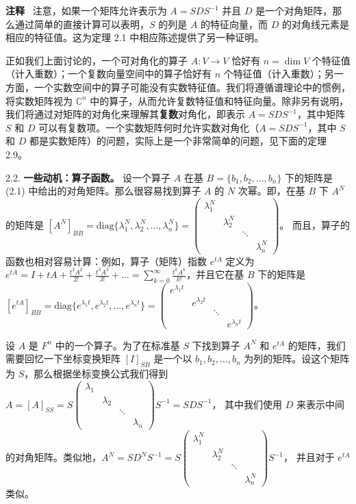 \textbf{注释} ~注意，如果一个矩阵允许表示为 $A = SDS^{-1}$ 并且 $D$ 是一个对角矩阵，那么通过简单的直接计算可以表明，$S$ 的列是 $A$ 的特征向量，而 $D$ 的对角线元素是相应的特征值。这为定理 2.1 中相应陈述提供了另一种证明。



正如我们上面讨论的，一个可对角化的算子 $A: V \to V$ 恰好有 $n = \dim V$ 个特征值（计入重数）；一个复数向量空间中的算子恰好有 $n$ 个特征值（计入重数）；另一方面，一个实数空间中的算子可能没有实数特征值。我们将遵循谱理论中的惯例，将实数矩阵视为 $\mathbb{C}^n$ 中的算子，从而允许复数特征值和特征向量。除非另有说明，我们将通过对矩阵的对角化来理解其\textbf{复数}对角化，即表示 $A = SDS^{-1}$，其中矩阵 $S$ 和 $D$ 可以有复数项。一个实数矩阵何时允许实数对角化（$A = SDS^{-1}$，其中 $S$ 和 $D$ 都是实数矩阵）的问题，实际上是一个非常简单的问题，见下面的定理 2.9。

2.2. \textbf{一些动机：算子函数。} 设一个算子 $A$ 在基 $B = \{b_1, b_2, \dots, b_n\}$ 下的矩阵是 (2.1) 中给出的对角矩阵。那么很容易找到算子 $A$ 的 $N$ 次幂。即，在基 $B$ 下 $A^N$ 的矩阵是 $[A^N]_{BB} = \text{diag}\{\lambda_1^N, \lambda_2^N, \dots, \lambda_n^N\} = \begin{pmatrix} \lambda_1^N & & & \\ & \lambda_2^N & & \\ & & \ddots & \\ & & & \lambda_n^N \end{pmatrix}$。
而且，算子的函数也相对容易计算：例如，算子（矩阵）指数 $e^{tA}$ 定义为 $e^{tA} = I + tA + \frac{t^2 A^2}{2!} + \frac{t^3 A^3}{3!} + \dots = \sum_{k=0}^\infty \frac{t^k A^k}{k!}$，并且它在基 $B$ 下的矩阵是 $[e^{tA}]_{BB} = \text{diag}\{e^{\lambda_1 t}, e^{\lambda_2 t}, \dots, e^{\lambda_n t}\} = \begin{pmatrix} e^{\lambda_1 t} & & & \\ & e^{\lambda_2 t} & & \\ & & \ddots & \\ & & & e^{\lambda_n t} \end{pmatrix}$。

设 $A$ 是 $F^n$ 中的一个算子。为了在标准基 $S$ 下找到算子 $A^N$ 和 $e^{tA}$ 的矩阵，我们需要回忆一下坐标变换矩阵 $[I]_{SB}$ 是一个以 $b_1, b_2, \dots, b_n$ 为列的矩阵。设这个矩阵为 $S$，那么根据坐标变换公式我们得到
$A = [A]_{SS} = S \begin{pmatrix} \lambda_1 & & & \\ & \lambda_2 & & \\ & & \ddots & \\ & & & \lambda_n \end{pmatrix} S^{-1} = SDS^{-1}$，
其中我们使用 $D$ 来表示中间的对角矩阵。类似地，$A^N = SD^N S^{-1} = S \begin{pmatrix} \lambda_1^N & & & \\ & \lambda_2^N & & \\ & & \ddots & \\ & & & \lambda_n^N \end{pmatrix} S^{-1}$，
并且对于 $e^{tA}$ 类似。

